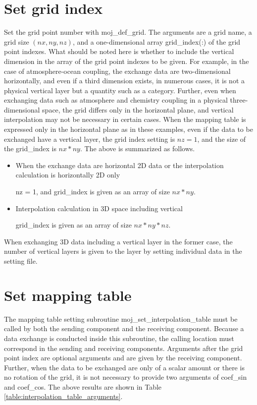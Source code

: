 \documentclass[11pt,a4paper]{report}
\newcommand{\tabref}[1]{Table \ref{#1}}
\begin{document}
\section{Set grid index}
Set the grid point number with moj\_def\_grid. 
The arguments are a grid name, a grid size $(nx, ny, nz)$, and a one-dimensional array grid\_index(:) of the grid point indexes. 
What should be noted here is whether to include the vertical dimension in the array of the grid point indexes to be given. 
For example, in the case of atmosphere-ocean coupling, the exchange data are two-dimensional horizontally, and even if a third dimension exists, in numerous cases, it is not a physical vertical layer but a quantity such as a category. 
Further, even when exchanging data such as atmosphere and chemistry coupling in a physical three-dimensional space, the grid differs only in the horizontal plane, and vertical interpolation may not be necessary in certain cases. 
When the mapping table is expressed only in the horizontal plane as in these examples, even if the data to be exchanged have a vertical layer, the grid index setting is $ nz = 1 $, and the size of the grid\_index is $nx *ny$.
The above is summarized as follows.

\begin{itemize}
\item{When the exchange data are horizontal 2D data or the interpolation calculation is horizontally 2D only}

nz = 1, and grid\_index is given as an array of size $nx * ny$.

\item{Interpolation calculation in 3D space including vertical}

grid\_index is given as an array of size $nx * ny * nz$.

\end{itemize}

When exchanging 3D data including a vertical layer in the former case, the number of vertical layers is given to the layer by setting individual data in the setting file.


\section{Set mapping table}
The mapping table setting subroutine moj\_set\_interpolation\_table must be called by both the sending component and the receiving component. 
Because a data exchange is conducted inside this subroutine, the calling location must correspond in the sending and receiving components. 
Arguments after the grid point index are optional arguments and are given by the receiving component. 
Further, when the data to be exchanged are only of a scalar amount or there is no rotation of the grid, it is not necessary to provide two arguments of coef\_sin and coef\_cos. 
The above results are shown in \tabref{table:interpolation_table_arguments}.
\end{document}
